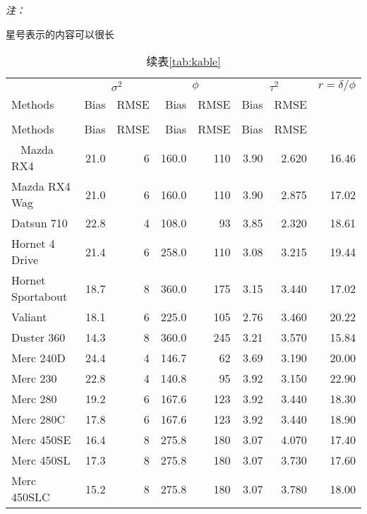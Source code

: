 \documentclass[]{book}
\begin{document}
\begin{ThreePartTable}
\begin{TableNotes}
\item \textit{注：} 
\item * 星号表示的内容可以很长
\end{TableNotes}
\begin{longtable}{lrrrrrrr}
\caption{\label{tab:kableExtra-in-bookdown}第1种类型的统计表格样式}\\
\toprule
\multicolumn{1}{c}{ } & \multicolumn{2}{c}{$\sigma^2$} & \multicolumn{2}{c}{$\phi$} & \multicolumn{2}{c}{$\tau^2$} & \multicolumn{1}{c}{$r=\delta/\phi$} \\
\cmidrule(l{3pt}r{3pt}){2-3} \cmidrule(l{3pt}r{3pt}){4-5} \cmidrule(l{3pt}r{3pt}){6-7} \cmidrule(l{3pt}r{3pt}){8-8}
Methods & Bias & RMSE & Bias & RMSE & Bias & RMSE & \\
\midrule
\endfirsthead
\caption[]{续表\ref{tab:kable}}\\
\toprule
Methods & Bias & RMSE & Bias & RMSE & Bias & RMSE & \\
\midrule
\endhead
\
\endfoot
\bottomrule
\insertTableNotes
\endlastfoot
Mazda RX4 & 21.0 & 6 & 160.0 & 110 & 3.90 & 2.620 & 16.46\\
Mazda RX4 Wag & 21.0 & 6 & 160.0 & 110 & 3.90 & 2.875 & 17.02\\
Datsun 710 & 22.8 & 4 & 108.0 & 93 & 3.85 & 2.320 & 18.61\\
Hornet 4 Drive & 21.4 & 6 & 258.0 & 110 & 3.08 & 3.215 & 19.44\\
Hornet Sportabout & 18.7 & 8 & 360.0 & 175 & 3.15 & 3.440 & 17.02\\
Valiant & 18.1 & 6 & 225.0 & 105 & 2.76 & 3.460 & 20.22\\
\midrule
Duster 360 & 14.3 & 8 & 360.0 & 245 & 3.21 & 3.570 & 15.84\\
Merc 240D & 24.4 & 4 & 146.7 & 62 & 3.69 & 3.190 & 20.00\\
Merc 230 & 22.8 & 4 & 140.8 & 95 & 3.92 & 3.150 & 22.90\\
Merc 280 & 19.2 & 6 & 167.6 & 123 & 3.92 & 3.440 & 18.30\\
Merc 280C & 17.8 & 6 & 167.6 & 123 & 3.92 & 3.440 & 18.90\\
Merc 450SE & 16.4 & 8 & 275.8 & 180 & 3.07 & 4.070 & 17.40\\
\midrule
Merc 450SL & 17.3 & 8 & 275.8 & 180 & 3.07 & 3.730 & 17.60\\
Merc 450SLC & 15.2 & 8 & 275.8 & 180 & 3.07 & 3.780 & 18.00\\

\end{longtable}
\end{ThreePartTable}
\end{document}
